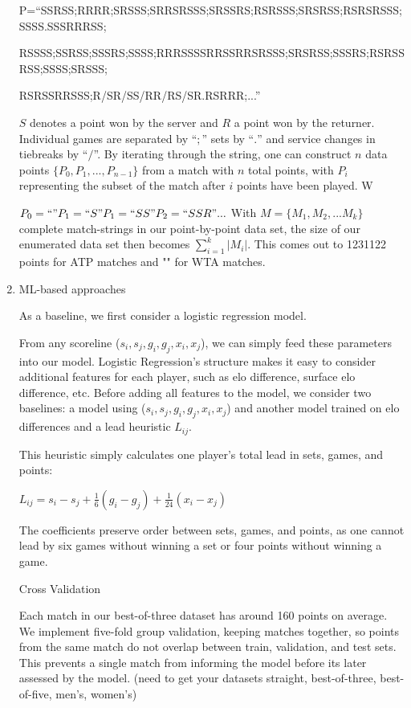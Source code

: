 \documentclass[11pt]{article}
\begin{document}
\begin{enumerate}
P=``SSRSS;RRRR;SRSSS;SRRSRSSS;SRSSRS;RSRSSS;SRSRSS;RSRSRSSS;SSSS.SSSRRRSS;

RSSSS;SSRSS;SSSRS;SSSS;RRRSSSSRRSSRRSRSSS;SRSRSS;SSSRS;RSRSSRSS;SSSS;SRSSS;

RSRSSRRSSS;R/SR/SS/RR/RS/SR.RSRRR;...''

$S$ denotes a point won by the server and $R$ a point won by the returner. Individual games are separated by ``$;$'' sets by ``$.$'' and service changes in tiebreaks by ``$/$''. By iterating through the string, one can construct $n$ data points $\{P_0,P_1,...,P_{n-1}\}$ from a match with $n$ total points, with $P_i$ representing the subset of the match after $i$ points have been played. W

$P_0 = ``"
\newline
P_1 = ``S"
\newline
P_1 = ``SS"
\newline
P_2 = ``SSR"
\newline
...
\newline$
With $M = \{M_1,M_2,...M_k\}$ complete match-strings in our point-by-point data set, the size of our enumerated data set then becomes $\sum_{i=1}^k |M_i|$. This comes out to 1231122 points for ATP matches and "" for WTA matches.



\item ML-based approaches

As a baseline, we first consider a logistic regression model. 

From any scoreline  ($s_i,s_j,g_i,g_j,{x}_i,{x}_j$), we can simply feed these parameters into our model. Logistic Regression's structure makes it easy to consider additional features for each player, such as elo difference, surface elo difference, etc. Before adding all features to the model, we consider two baselines: a model using ($s_i,s_j,g_i,g_j,{x}_i,{x}_j$) and another model trained on elo differences and a lead heuristic $L_{ij}$.

This heuristic simply calculates one player's total lead in sets, games, and points:

$L_{ij} = s_i-s_j + \frac{1}{6}(g_i-g_j) + \frac{1}{24}(x_i-x_j)$

The coefficients preserve order between sets, games, and points, as one cannot lead by six games without winning a set or four points without winning a game.

Cross Validation

Each match in our best-of-three dataset has around 160 points on average. We implement five-fold group validation, keeping matches together, so points from the same match do not overlap between train, validation, and test sets. This prevents a single match from informing the model before its later assessed by the model. (need to get your datasets straight, best-of-three, best-of-five, men's, women's)




\end{enumerate}
\end{document}
